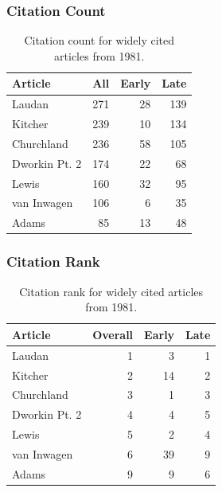 \documentclass[
  10pt,
  letterpaper,
  DIV=11,
  numbers=noendperiod,
  twoside]{scrartcl}
\begin{document}
\subsubsection*{Citation Count}\label{sec-count-1981}

\begin{longtable}[]{@{}lrrr@{}}

\caption{\label{tbl-citation-count-1981}Citation count for widely cited
articles from 1981.}

\tabularnewline

\toprule\noalign{}
Article & All & Early & Late \\
\midrule\noalign{}
\endhead
\bottomrule\noalign{}
\endlastfoot
Laudan & 271 & 28 & 139 \\
Kitcher & 239 & 10 & 134 \\
Churchland & 236 & 58 & 105 \\
Dworkin Pt. 2 & 174 & 22 & 68 \\
Lewis & 160 & 32 & 95 \\
van Inwagen & 106 & 6 & 35 \\
Adams & 85 & 13 & 48 \\

\end{longtable}

\subsubsection*{Citation Rank}\label{sec-rank-1981}

\begin{longtable}[]{@{}lrrr@{}}

\caption{\label{tbl-citation-rank-1981}Citation rank for widely cited
articles from 1981.}

\tabularnewline

\toprule\noalign{}
Article & Overall & Early & Late \\
\midrule\noalign{}
\endhead
\bottomrule\noalign{}
\endlastfoot
Laudan & 1 & 3 & 1 \\
Kitcher & 2 & 14 & 2 \\
Churchland & 3 & 1 & 3 \\
Dworkin Pt. 2 & 4 & 4 & 5 \\
Lewis & 5 & 2 & 4 \\
van Inwagen & 6 & 39 & 9 \\
Adams & 9 & 9 & 6 \\

\end{longtable}
\end{document}
